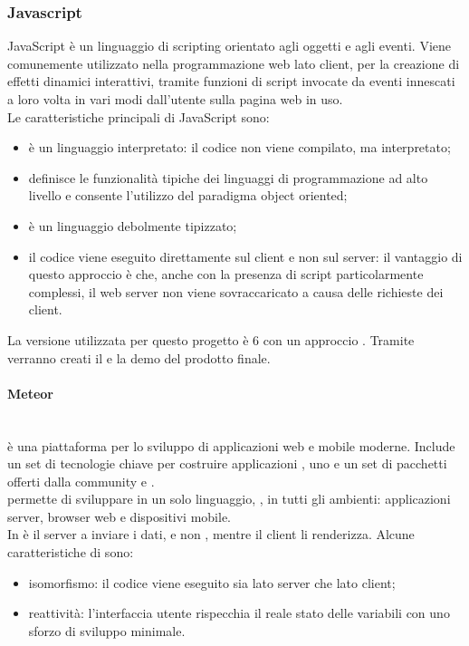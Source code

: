 \subsubsection{Javascript}
JavaScript è un linguaggio di scripting orientato agli oggetti e agli eventi. Viene comunemente utilizzato nella programmazione web lato client, per la creazione di effetti dinamici interattivi, tramite funzioni di script invocate da eventi innescati a loro volta in vari modi dall'utente sulla pagina web in uso.\\
Le caratteristiche principali di JavaScript sono:
\begin{itemize}
	\item è un linguaggio interpretato: il codice non viene compilato, ma interpretato;
	\item definisce le funzionalità tipiche dei linguaggi di programmazione ad alto livello e consente l'utilizzo del paradigma object oriented;
	\item è un linguaggio debolmente tipizzato;
	\item il codice viene eseguito direttamente sul client e non sul server: il vantaggio di questo approccio è che, anche con la presenza di script particolarmente complessi, il web server non viene sovraccaricato a causa delle richieste dei client.
\end{itemize}
La versione utilizzata per questo progetto è  6 con un approccio .
Tramite  verranno creati il  e la demo del prodotto finale.

\paragraph{Meteor}\mbox{}\\
 è una piattaforma   per lo sviluppo di applicazioni web e mobile moderne. Include un set di tecnologie chiave per costruire applicazioni  , uno  e un set di pacchetti offerti dalla community  e .\\
 permette di sviluppare in un solo linguaggio, , in tutti gli ambienti: applicazioni server, browser web e dispositivi mobile.\\
In  è il server a inviare i dati, e non , mentre il client li renderizza.
Alcune caratteristiche di  sono:
\begin{itemize}
	\item isomorfismo: il codice viene eseguito sia lato server che lato client;
	\item reattività: l'interfaccia utente rispecchia il reale stato delle variabili con uno sforzo di sviluppo minimale.
\end{itemize}


